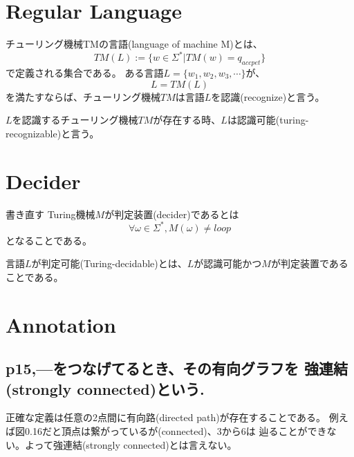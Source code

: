 \documentclass[b5paper,fleqn]{ltjsarticle}
\newcommand\s[1]{\subsection*{#1}\noindent\ignorespaces}
\begin{document}
\section{Regular Language}
チューリング機械TMの言語(language of machine M)とは、
\[TM(L):=\{w\in \Sigma^*|TM(w)=q_{accpet}\}\]
で定義される集合である。
ある言語$L=\{w_1,w_2,w_3,\cdots\}$が、
\[L=TM(L)\]
を満たすならば、チューリング機械$TM$は言語$L$を認識(recognize)と言う。\par
$L$を認識するチューリング機械$TM$が存在する時、$L$は認識可能(turing-recognizable)と言う。
\section{Decider}
書き直す
Turing機械$M$が判定装置(decider)であるとは
\[\forall\omega\in\Sigma^*, M(\omega)\neq loop\]
となることである。\par
言語$L$が判定可能(Turing-decidable)とは、$L$が認識可能かつ$M$が判定装置であることである。

\section{Annotation}

\s{p15,---をつなげてるとき、その有向グラフを
強連結(strongly connected)という.}
正確な定義は任意の2点間に有向路(directed path)が存在することである。
例えば図0.16だと頂点は繋がっているが(connected)、3から6は
辿ることができない。よって強連結(strongly connected)とは言えない。
\end{document}
